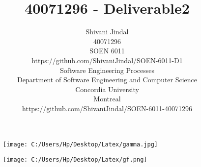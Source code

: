 \documentclass[10pt]{article}
\begin{document}
\title{40071296 - Deliverable2}

\LARGE{\author{
	Shivani Jindal \\
	40071296\\
	SOEN 6011\\
	https://github.com/ShivaniJindal/SOEN-6011-D1\\
	Software Engineering Processes\\
	Department of Software Engineering and Computer Science\\
	Concordia University\\
	Montreal\\
https://github.com/ShivaniJindal/SOEN-6011-40071296 }}
\maketitle

\begin{figure} [h]
	\centering
	\texttt{[image: C:/Users/Hp/Desktop/Latex/gamma.jpg]}
\end{figure}

\begin{figure}[h]
	\centering
	\texttt{[image: C:/Users/Hp/Desktop/Latex/gf.png]}
\end{figure}

\onehalfspacing  
\newpage
\end{document}

